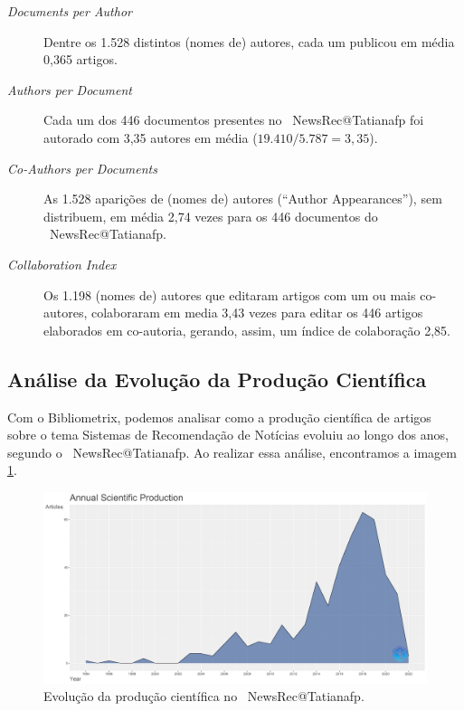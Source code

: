 \begin{description}
    \item [\textit{Documents per Author}] Dentre os 1.528 distintos (nomes de) autores, cada um publicou em média 0,365 artigos.
    \item [\textit{Authors per Document}] Cada um dos 446 documentos presentes no \dataset\   NewsRec@Tatianafp foi autorado com 3,35 autores em média ($19.410 / 5.787 = 3,35$).
    \item [\textit{Co-Authors per Documents}] As 1.528 aparições de (nomes de) autores (``Author Appearances''), sem distribuem, em média 2,74 vezes para os 446 documentos do \dataset\  NewsRec@Tatianafp.
    \item [\textit{Collaboration Index}] Os 1.198 (nomes de) autores que editaram artigos com um ou mais co-autores, colaboraram em media 3,43 vezes para editar os 446 artigos elaborados em co-autoria, gerando, assim, um índice de colaboração 2,85. 
\end{description}

\subsection{Análise da Evolução da Produção Científica}

Com o Bibliometrix, podemos analisar como a produção científica de artigos sobre o tema Sistemas de Recomendação de Notícias evoluiu ao longo dos anos, segundo o \dataset\  NewsRec@Tatianafp. Ao realizar essa análise, encontramos a imagem \ref{fig:evol_anual_NewsRec_Tatianafp}. 

\begin{figure}
    \centering
    \includegraphics[width=1\textwidth]{experiments/Tatianafp/PesquisaBibliometrica/images/AnnualScientificProduction.png}
    \caption{Evolução da produção científica no \dataset\  NewsRec@Tatianafp.}
    \label{fig:evol_anual_NewsRec_Tatianafp}
\end{figure}

